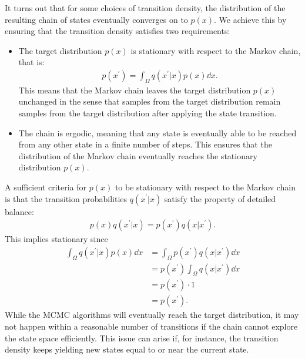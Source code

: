 It turns out that for some choices of transition density, the distribution of the resulting chain of states eventually converges on to $p(x)$.
We achieve this by ensuring that the transition density satisfies two requirements:

\begin{itemize}
    \item The target distribution $p(x)$ is stationary with respect to the Markov chain, that is:
    \begin{align} \label{eq:stationarity}
        p(x^\prime) = \int_{\Omega} q(x^\prime| x) p(x) \dd{x}.
    \end{align}
    This means that the Markov chain leaves the target distribution $p(x)$ unchanged in the sense that samples from the target distribution remain samples from the target distribution after applying the state transition.
    
    \item The chain is ergodic, meaning that any state is eventually able to be reached from any other state in a finite number of steps.
    This ensures that the distribution of the Markov chain eventually reaches the stationary distribution $p(x)$.
    
\end{itemize}
A sufficient criteria for $p(x)$ to be stationary with respect to the Markov chain is that the transition probabilities $q(x^\prime|x)$ satisfy the property of detailed balance:
\begin{align} \label{eq:detailed-balance}
    p(x)q(x^\prime | x) = p(x^\prime)q(x| x^\prime).
\end{align}
This implies stationary since
\begin{align}    
    \int_{\Omega} q(x^\prime | x) p(x) \dd{x} 
    &= \int_{\Omega}  p(x^\prime)q(x| x^\prime) \dd{x} \\ 
    &=  p(x^\prime) \int_{\Omega} q(x| x^\prime) \dd{x} \\
    &=  p(x^\prime) \cdot 1 \\
    &= p(x^\prime).
\end{align}
While the MCMC algorithms will eventually reach the target distribution, it may not happen within a reasonable number of transitions if the chain cannot explore the state space efficiently. 
This issue can arise if, for instance, the transition density keeps yielding new states equal to or near the current state.  


